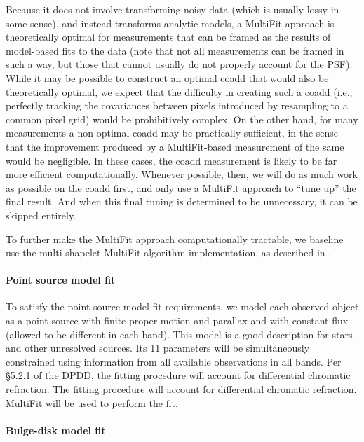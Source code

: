 \documentclass[12pt]{article}
\begin{document}
Because it does not involve transforming noisy data (which is usually
lossy in some sense), and instead transforms analytic models, a
MultiFit approach is theoretically optimal for measurements that can
be framed as the results of model-based fits to the data (note that
not all measurements can be framed in such a way, but those that
cannot usually do not properly account for the PSF). %
While it may be
possible to construct an optimal coadd that would also be
theoretically optimal, we expect that the difficulty in creating such
a coadd (i.e., perfectly tracking the covariances between pixels
introduced by resampling to a common pixel grid) would be prohibitively
complex.  On the other hand, for many measurements a non-optimal coadd
may be practically
sufficient, in the sense that the improvement produced by a
MultiFit-based measurement of the same would be negligible.  In these
cases, the coadd measurement is likely to be far more efficient
computationally.  Whenever possible, then, we will do as much work as
possible on the coadd first, and only use a MultiFit approach to ``tune up''
the final result.  And when this final tuning is determined to be
unnecessary, it can be skipped entirely.

To further make the MultiFit approach computationally tractable, we baseline use the multi-shapelet MultiFit algorithm implementation, as described in \cite{Bosch13}.

\paragraph{Point source model fit}

To satisfy the point-source model fit requirements, we model each observed object as a point source with finite proper motion and parallax and with constant flux (allowed to be different in each band). This model is a good description for stars and other unresolved sources. Its 11 parameters will be simultaneously constrained using information from all available observations in all bands. Per \S5.2.1 of the DPDD, the fitting procedure will account for differential chromatic refraction. The fitting procedure will account for differential chromatic refraction. MultiFit will be used to perform the fit.

\paragraph{Bulge-disk model fit}
\label{alg:bulgedisk}
\end{document}
